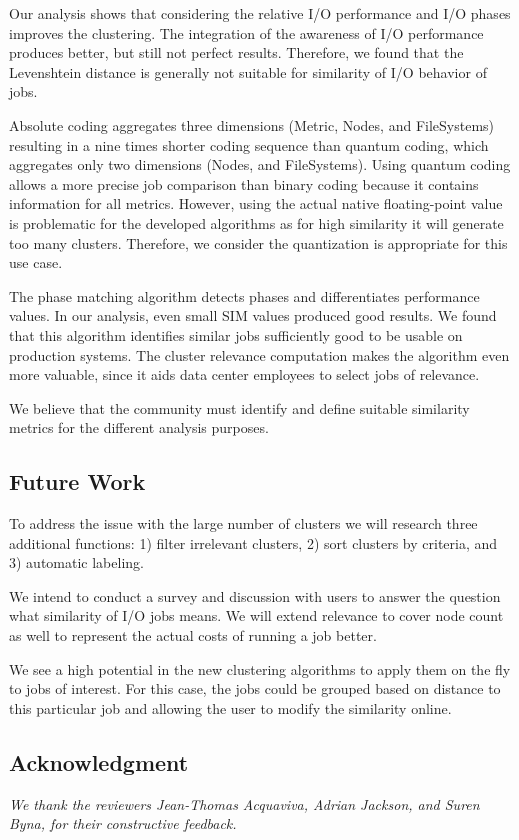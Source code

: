 \documentclass{jhps}
\begin{document}
{{{{Our analysis shows that considering the relative I/O performance and I/O phases improves the clustering.
The integration of the awareness of I/O performance produces better, but still not perfect results.
Therefore, we found that the Levenshtein distance is generally not suitable for similarity of I/O behavior of jobs.

Absolute coding aggregates three dimensions (Metric, Nodes, and FileSystems) resulting in a nine times shorter coding sequence than quantum coding, which aggregates only two dimensions (Nodes, and FileSystems).
Using quantum coding allows a more precise job comparison than binary coding because it contains information for all metrics.
However, using the actual native floating-point value is problematic for the developed algorithms as for high similarity it will generate too many clusters.
Therefore, we consider the quantization is appropriate for this use case.

The phase matching algorithm detects phases and differentiates performance values.
In our analysis, even small SIM values produced good results.
We found that this algorithm identifies similar jobs sufficiently good to be usable on production systems.
The cluster relevance computation makes the algorithm even more valuable, since it aids data center employees to select jobs of relevance.

We believe that the community must identify and define suitable similarity metrics for the different analysis purposes.


\subsection{Future Work}
To address the issue with the large number of clusters we will research three additional functions: 1) filter irrelevant clusters, 2) sort clusters by criteria, and 3) automatic labeling.

We intend to conduct a survey and discussion with users to answer the question what similarity of I/O jobs means.
We will extend relevance to cover node count as well to represent the actual costs of running a job better.

We see a high potential in the new clustering algorithms to apply them on the fly to jobs of interest.
For this case, the jobs could be grouped based on distance to this particular job and allowing the user to modify the similarity online.


\subsection*{Acknowledgment} %
\textit{We thank the reviewers Jean-Thomas Acquaviva, Adrian Jackson, and Suren Byna, for their constructive feedback.}

}}}}
\end{document}
